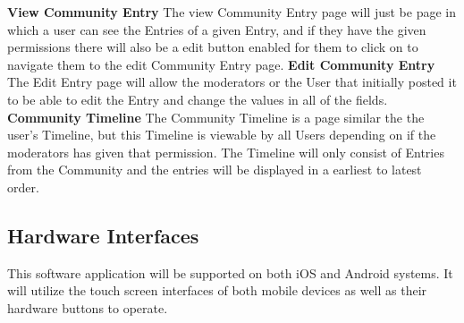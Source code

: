 \documentclass[letterpaper, 10, draftclsnofoot, onecolumn]{IEEEtran}
\begin{document}
\newline
\newline
\textbf{View Community Entry}
\newline
\indent The view Community Entry page will just be page in which a user can see the Entries of a given Entry, and if they have the given permissions there will also be a edit button enabled for them to click on to navigate them to the edit Community Entry page. 
\newline
\newline
\textbf{Edit Community Entry}
\newline
\indent The Edit Entry page will allow the moderators or the User that initially posted it to be able to edit the Entry and change the values in all of the fields.
\newline
\newline
\textbf{Community Timeline}
\newline
\indent The Community Timeline is a page similar the the user's Timeline, but this Timeline is viewable by all Users depending on if the moderators has given that permission. The Timeline will only consist of Entries from the Community and the entries will be displayed in a earliest to latest order.


\subsection{Hardware Interfaces}
This software application will be supported on both iOS and Android systems. It will utilize the touch screen interfaces of both mobile devices as well as their hardware buttons to operate. 

\end{document}
